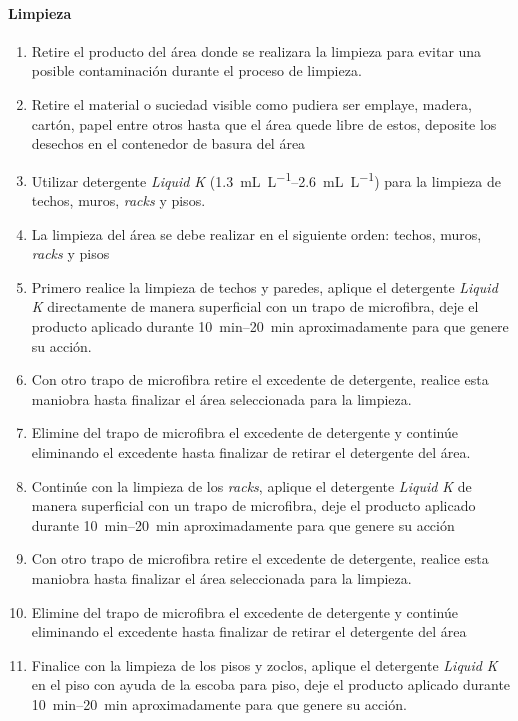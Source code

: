 \paragraph{Limpieza}
\begin{enumerate}
	\item Retire el producto del área donde se realizara la limpieza para evitar una posible contaminación durante el proceso de limpieza.
	\item Retire el material o suciedad visible como pudiera ser emplaye, madera, cartón, papel entre otros hasta que el área quede libre de estos, deposite los desechos en el contenedor de basura del área
	\item Utilizar detergente \textit{Liquid K} (\qtyrange{1.3}{2.6}{\milli\liter\per\liter}) para la limpieza de techos, muros, \textit{racks} y pisos.
	\item La limpieza del área se debe realizar en el siguiente orden: techos, muros, \textit{racks} y pisos
	\item Primero realice la limpieza de techos y paredes, aplique el detergente \textit{Liquid K} directamente de manera superficial con un trapo de microfibra, deje el producto aplicado durante \qtyrange{10}{20}{\minute} aproximadamente para que genere su acción.
	\item Con otro trapo de microfibra retire el excedente de detergente, realice esta maniobra hasta finalizar el área seleccionada para la limpieza.
	\item Elimine del trapo de microfibra el excedente de detergente y continúe eliminando el excedente hasta finalizar de retirar el detergente del área.
	\item Continúe con la limpieza de los \textit{racks}, aplique el detergente \textit{Liquid K} de manera superficial con un trapo de microfibra, deje el producto aplicado durante \qtyrange{10}{20}{\minute} aproximadamente para que genere su acción
	\item Con otro trapo de microfibra retire el excedente de detergente, realice esta maniobra hasta finalizar el área seleccionada para la limpieza.
	\item Elimine del trapo de microfibra el excedente de detergente y continúe eliminando el excedente hasta finalizar de retirar el detergente del área
	\item Finalice con la limpieza de los pisos y zoclos, aplique el detergente \textit{Liquid K} en el piso con ayuda de la escoba para piso, deje el producto aplicado durante \qtyrange{10}{20}{\minute} aproximadamente para que genere su acción.

\end{enumerate}
